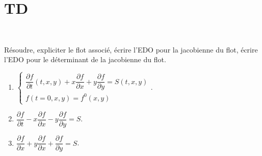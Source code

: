 \documentclass[12pt,a4paper]{article}
\newcommand\diff[2]{\dfrac{\partial #1}{\partial #2}}
\begin{document}
	\section{TD}
	
	\begin{exo}$ $
		
		\begin{minipage}{17cm}
			Résoudre, expliciter le flot associé, écrire l'EDO pour la jacobienne du flot, écrire l'EDO pour le déterminant de la jacobienne du flot.
		\begin{enumerate}
			\item $\begin{cases}
				\diff ft(t,x,y) + x\diff fx + y\diff fy = S(t,x,y)\\
				f(t=0,x,y) = f^0(x,y)
			\end{cases}.$
			\item $\diff ft - x\diff fx - y\diff fy = S$.
			\item $\diff fx + y \diff fx +  \diff fy = S$.
		\end{enumerate}
		\end{minipage}
	\end{exo}
\end{document}
